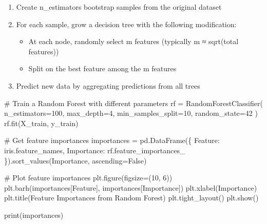 \documentclass[
  letterpaper,
  DIV=11,
  numbers=noendperiod]{scrreprt}
\newenvironment{Shaded}{\begin{snugshade}}{\end{snugshade}}
\newcommand{\BuiltInTok}[1]{\textcolor[rgb]{0.00,0.23,0.31}{#1}}
\newcommand{\CommentTok}[1]{\textcolor[rgb]{0.37,0.37,0.37}{#1}}
\newcommand{\DecValTok}[1]{\textcolor[rgb]{0.68,0.00,0.00}{#1}}
\newcommand{\NormalTok}[1]{\textcolor[rgb]{0.00,0.23,0.31}{#1}}
\newcommand{\OperatorTok}[1]{\textcolor[rgb]{0.37,0.37,0.37}{#1}}
\newcommand{\StringTok}[1]{\textcolor[rgb]{0.13,0.47,0.30}{#1}}
\newcommand{\VariableTok}[1]{\textcolor[rgb]{0.07,0.07,0.07}{#1}}
\providecommand{\tightlist}{%
  \setlength{\itemsep}{0pt}\setlength{\parskip}{0pt}}\usepackage{longtable,booktabs,array}
\begin{document}
\begin{enumerate}
\def\labelenumi{\arabic{enumi}.}
\tightlist
\item
  Create n\_estimators bootstrap samples from the original dataset
\item
  For each sample, grow a decision tree with the following modification:

  \begin{itemize}
  \tightlist
  \item
    At each node, randomly select m features (typically m ≈ sqrt(total
    features))
  \item
    Split on the best feature among the m features
  \end{itemize}
\item
  Predict new data by aggregating predictions from all trees
\end{enumerate}

\begin{Shaded}
\begin{Highlighting}[]
\CommentTok{\# Train a Random Forest with different parameters}
\NormalTok{rf }\OperatorTok{=}\NormalTok{ RandomForestClassifier(}
\NormalTok{    n\_estimators}\OperatorTok{=}\DecValTok{100}\NormalTok{,}
\NormalTok{    max\_depth}\OperatorTok{=}\DecValTok{4}\NormalTok{,}
\NormalTok{    min\_samples\_split}\OperatorTok{=}\DecValTok{10}\NormalTok{,}
\NormalTok{    random\_state}\OperatorTok{=}\DecValTok{42}
\NormalTok{)}
\NormalTok{rf.fit(X\_train, y\_train)}

\CommentTok{\# Get feature importances}
\NormalTok{importances }\OperatorTok{=}\NormalTok{ pd.DataFrame(\{}
    \StringTok{\textquotesingle{}Feature\textquotesingle{}}\NormalTok{: iris.feature\_names,}
    \StringTok{\textquotesingle{}Importance\textquotesingle{}}\NormalTok{: rf.feature\_importances\_}
\NormalTok{\}).sort\_values(}\StringTok{\textquotesingle{}Importance\textquotesingle{}}\NormalTok{, ascending}\OperatorTok{=}\VariableTok{False}\NormalTok{)}

\CommentTok{\# Plot feature importances}
\NormalTok{plt.figure(figsize}\OperatorTok{=}\NormalTok{(}\DecValTok{10}\NormalTok{, }\DecValTok{6}\NormalTok{))}
\NormalTok{plt.barh(importances[}\StringTok{\textquotesingle{}Feature\textquotesingle{}}\NormalTok{], importances[}\StringTok{\textquotesingle{}Importance\textquotesingle{}}\NormalTok{])}
\NormalTok{plt.xlabel(}\StringTok{\textquotesingle{}Importance\textquotesingle{}}\NormalTok{)}
\NormalTok{plt.title(}\StringTok{\textquotesingle{}Feature Importances from Random Forest\textquotesingle{}}\NormalTok{)}
\NormalTok{plt.tight\_layout()}
\NormalTok{plt.show()}

\BuiltInTok{print}\NormalTok{(importances)}
\end{Highlighting}
\end{Shaded}
\end{document}
